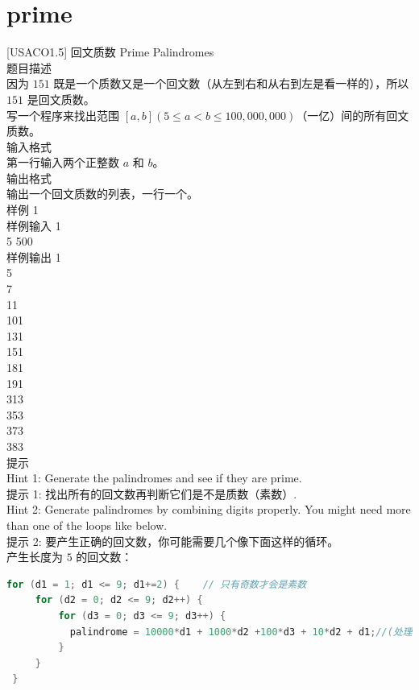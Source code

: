 \documentclass[12pt,twiside,a4paper]{ctexbook}
\numberwithin{chapter}{part}
\begin{document}
\section{prime}
 [USACO1.5] 回文质数 Prime Palindromes\\
 题目描述\\
因为 $151$ 既是一个质数又是一个回文数（从左到右和从右到左是看一样的），所以 $151$ 是回文质数。\\
写一个程序来找出范围 $[a,b] (5 \le a < b \le 100,000,000)$（一亿）间的所有回文质数。\\
 输入格式\\
第一行输入两个正整数 $a$ 和 $b$。\\
 输出格式\\
输出一个回文质数的列表，一行一个。\\
 样例 1\\
 样例输入 1\\
5 500\\
 样例输出 1\\
5\\
7\\
11\\
101\\
131\\
151\\
181\\
191\\
313\\
353\\
373\\
383\\
 提示\\
Hint 1: Generate the palindromes and see if they are prime.\\
提示 1: 找出所有的回文数再判断它们是不是质数（素数）.\\
Hint 2: Generate palindromes by combining digits properly. You might need more than one of the loops like below.\\
提示 2: 要产生正确的回文数，你可能需要几个像下面这样的循环。\\
产生长度为 $5$ 的回文数：\\
\begin{lstlisting}[language=C++,breaklines=true]
for (d1 = 1; d1 <= 9; d1+=2) {    // 只有奇数才会是素数
     for (d2 = 0; d2 <= 9; d2++) {
         for (d3 = 0; d3 <= 9; d3++) {
           palindrome = 10000*d1 + 1000*d2 +100*d3 + 10*d2 + d1;//(处理回文数...)
         }
     }
 }
\end{lstlisting}
\end{document}
